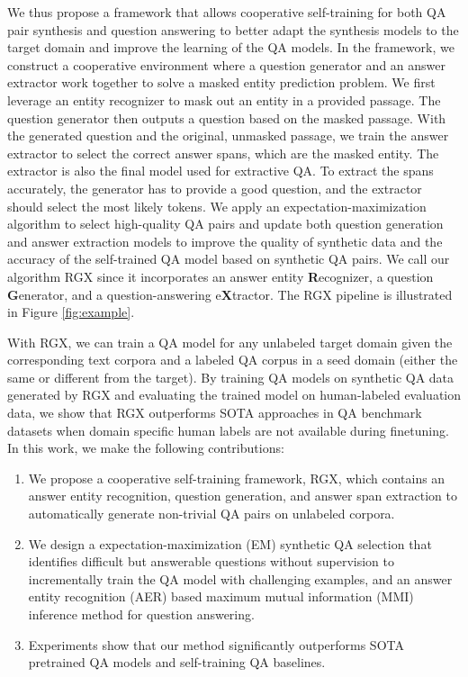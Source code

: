 \documentclass[11pt,a4paper]{article}
\begin{document}
We thus propose a framework that allows cooperative self-training for both QA pair synthesis and question answering to better adapt the synthesis models to the target domain and improve the learning of the QA models. In the framework, we construct a cooperative environment where a question generator and an answer extractor work together  to solve a masked entity prediction problem. We first leverage an entity recognizer to mask out an entity in a provided passage. The question generator then outputs a question based on the masked passage. With the generated question and the original, unmasked passage, we train the answer extractor to select the correct answer spans, which are the masked entity. The extractor is also the final model used for extractive QA. To extract the spans accurately, the generator has to provide a good question, and the extractor should select the most likely tokens.
We apply an expectation-maximization algorithm to select high-quality QA pairs and update both question generation and answer extraction models to improve the quality of synthetic data and the accuracy of the self-trained QA model based on synthetic QA pairs.
We call our algorithm RGX since it incorporates an answer entity \textbf{R}ecognizer, a question \textbf{G}enerator, and a question-answering e\textbf{X}tractor. The RGX pipeline is illustrated in Figure \ref{fig:example}.



With RGX, we can train a QA model for any unlabeled target domain given the corresponding text corpora and a labeled QA corpus in a seed domain (either the same or different from the target). By training QA models on synthetic QA data generated by RGX and evaluating the trained model on human-labeled evaluation data, we show that RGX outperforms SOTA approaches in QA benchmark datasets when domain specific human labels are not available during finetuning. In this work, we make the following contributions:
\begin{enumerate} \setlength{\itemsep}{0pt} \setlength{\parsep}{0pt}
\item We propose a cooperative self-training framework, RGX, which contains an answer entity recognition, question generation, and answer span extraction to automatically generate non-trivial QA pairs on unlabeled corpora.
\item We design a expectation-maximization (EM) synthetic QA selection that identifies difficult but answerable questions without supervision to incrementally train the QA model with challenging examples, and an answer entity recognition (AER) based maximum mutual information (MMI) inference method for question answering.
\item Experiments show that our method significantly outperforms SOTA pretrained QA models and self-training QA baselines.
\end{enumerate}
\end{document}
